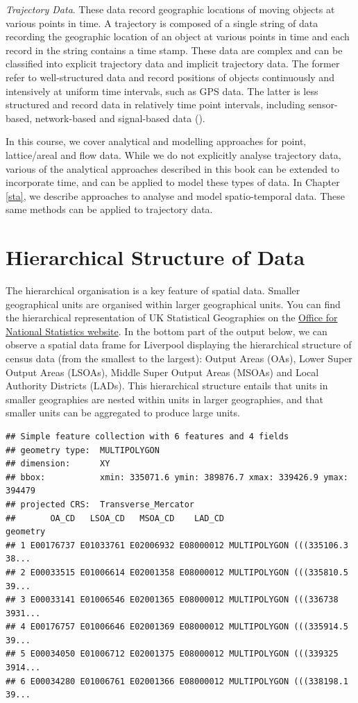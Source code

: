 \documentclass[
]{book}
\begin{document}
\emph{Trajectory Data}. These data record geographic locations of moving objects at various points in time. A trajectory is composed of a single string of data recording the geographic location of an object at various points in time and each record in the string contains a time stamp. These data are complex and can be classified into explicit trajectory data and implicit trajectory data. The former refer to well-structured data and record positions of objects continuously and intensively at uniform time intervals, such as GPS data. The latter is less structured and record data in relatively time point intervals, including sensor-based, network-based and signal-based data (\citet{kong2018big}).

In this course, we cover analytical and modelling approaches for point, lattice/areal and flow data. While we do not explicitly analyse trajectory data, various of the analytical approaches described in this book can be extended to incorporate time, and can be applied to model these types of data. In Chapter \ref{sta}, we describe approaches to analyse and model spatio-temporal data. These same methods can be applied to trajectory data.

\hypertarget{hierarchical-structure-of-data}{%
\section{Hierarchical Structure of Data}\label{hierarchical-structure-of-data}}

The hierarchical organisation is a key feature of spatial data. Smaller geographical units are organised within larger geographical units. You can find the hierarchical representation of UK Statistical Geographies on the \href{https://geoportal.statistics.gov.uk/search?collection=Document\&sort=name\&tags=all(DOC_HRSG\%2CDEC_2020)}{Office for National Statistics website}. In the bottom part of the output below, we can observe a spatial data frame for Liverpool displaying the hierarchical structure of census data (from the smallest to the largest): Output Areas (OAs), Lower Super Output Areas (LSOAs), Middle Super Output Areas (MSOAs) and Local Authority Districts (LADs). This hierarchical structure entails that units in smaller geographies are nested within units in larger geographies, and that smaller units can be aggregated to produce large units.

\begin{verbatim}
## Simple feature collection with 6 features and 4 fields
## geometry type:  MULTIPOLYGON
## dimension:      XY
## bbox:           xmin: 335071.6 ymin: 389876.7 xmax: 339426.9 ymax: 394479
## projected CRS:  Transverse_Mercator
##       OA_CD   LSOA_CD   MSOA_CD    LAD_CD                       geometry
## 1 E00176737 E01033761 E02006932 E08000012 MULTIPOLYGON (((335106.3 38...
## 2 E00033515 E01006614 E02001358 E08000012 MULTIPOLYGON (((335810.5 39...
## 3 E00033141 E01006546 E02001365 E08000012 MULTIPOLYGON (((336738 3931...
## 4 E00176757 E01006646 E02001369 E08000012 MULTIPOLYGON (((335914.5 39...
## 5 E00034050 E01006712 E02001375 E08000012 MULTIPOLYGON (((339325 3914...
## 6 E00034280 E01006761 E02001366 E08000012 MULTIPOLYGON (((338198.1 39...
\end{verbatim}
\end{document}
